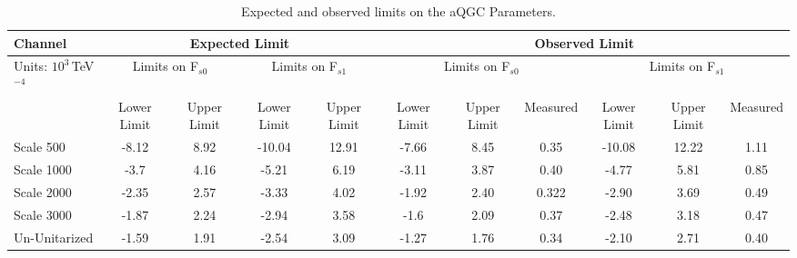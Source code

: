 \begin{table}[h!]
  \begin{center}
  \tiny
    \begin{tabular}{  | l | c c | c c | c c c | c c c | }
      \hline
      Channel & \multicolumn{4}{c|}{Expected Limit} &\multicolumn{6}{c|}{Observed Limit} \\\hline 
      Units: $10^3\,$TeV$^{-4}$& \multicolumn{2}{c|}{Limits on F$_{s0}$} & \multicolumn{2}{c|}{Limits on F$_{s1}$} & \multicolumn{3}{c|}{Limits on F$_{s0}$} & \multicolumn{3}{c|}{Limits on F$_{s1}$}  \\\hline
      & Lower Limit & Upper Limit & Lower Limit & Upper Limit & Lower Limit & Upper Limit & Measured & Lower Limit & Upper Limit & Measured  \\\hline
      Scale 500  & -8.12 & 8.92 & -10.04 & 12.91 & -7.66 & 8.45 & 0.35  & -10.08 & 12.22 & 1.11 \\\hline
      Scale 1000 & -3.7 & 4.16 & -5.21 & 6.19 & -3.11 & 3.87 & 0.40 & -4.77 & 5.81 & 0.85  \\\hline
      Scale 2000 & -2.35 & 2.57 & -3.33 & 4.02 & -1.92 & 2.40 & 0.322  & -2.90 & 3.69 & 0.49 \\\hline
      Scale 3000 & -1.87 & 2.24 & -2.94 & 3.58 & -1.6 & 2.09 & 0.37 & -2.48 & 3.18 & 0.47  \\\hline
      Un-Unitarized & -1.59 & 1.91 & -2.54 & 3.09  & -1.27 & 1.76  & 0.34 & -2.10 & 2.71  & 0.40 \\\hline
    \end{tabular}
    \caption{Expected and observed limits on the aQGC Parameters.}
    \label{tab:aQGC-Lim}

  \end{center}
\end{table}

